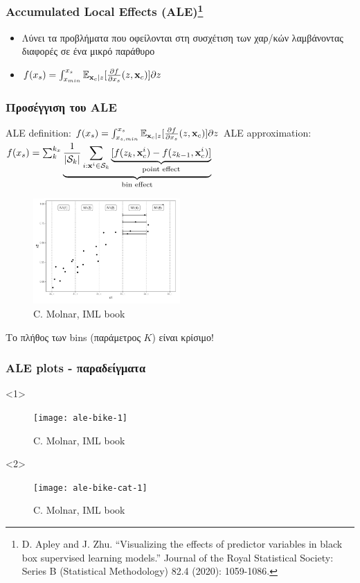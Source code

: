 \begin{frame}
  \frametitle{Accumulated Local Effects (ALE)\footnote{D. Apley and
    J. Zhu. ``Visualizing the effects of predictor variables in black box
    supervised learning models.'' Journal of the Royal Statistical Society:
    Series B (Statistical Methodology) 82.4 (2020): 1059-1086.}}

  \begin{itemize}
  \item Λύνει τα προβλήματα που οφείλονται στη συσχέτιση των χαρ/κών
    λαμβάνοντας διαφορές σε ένα μικρό παράθυρο
  \item \(f(x_s) = \int_{x_{min}}^{x_s}\mathbb{E}_{\mathbf{x}_c|z}[ \frac{\partial f}{\partial x_s}(z, \mathbf{x}_c)] \partial z\)
  \end{itemize}
\end{frame}

\begin{frame}
  \frametitle{Προσέγγιση του ALE}
  ALE definition: \( f(x_s) = \int_{x_{s, min}}^{x_s}\mathbb{E}_{\mathbf{x}_c|z}[ \frac{\partial f}{\partial x_s}(z, \mathbf{x}_c)] \partial z \)
  ALE approximation: \(f(x_s) = \sum_k^{k_x}
  \underbrace{\frac{1}{|\mathcal{S}_k|} \sum_{i:\mathbf{x}^i \in \mathcal{S}_k}
    \underbrace{[f(z_k, \mathbf{x}^i_c) - f(z_{k-1}, \mathbf{x}^i_c)]}_{\text{point
        effect}}}_{\text{bin effect}} \) 

  \begin{figure}[ht]
    \centering
    \includegraphics[width=0.5\textwidth]{./figures/ale_bins_iml.png}
    \caption{\footnotesize C. Molnar, IML book}
  \end{figure}

  \noindent\makebox[\linewidth]{\rule{\paperwidth}{0.4pt}}
  Το πλήθος των bins (παράμετρος \(K\)) είναι κρίσιμο!
\end{frame}

\begin{frame}
  \frametitle{ALE plots - παραδείγματα}
  \begin{onlyenv}<1>
    \begin{figure}
      \texttt{[image: ale-bike-1]}
      \caption{\footnotesize C. Molnar, IML book}
    \end{figure}
  \end{onlyenv}
  \begin{onlyenv}<2>
    \begin{figure}
      \texttt{[image: ale-bike-cat-1]}
      \caption{\footnotesize C. Molnar, IML book}
    \end{figure}
  \end{onlyenv}
\end{frame}

